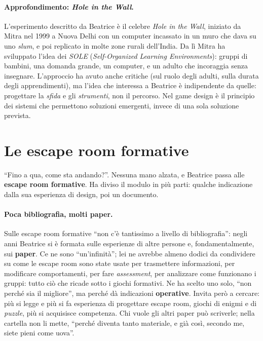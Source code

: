 \paragraph{Approfondimento: \emph{Hole in the Wall}.} L'esperimento descritto da
Beatrice è il celebre \emph{Hole in the Wall}, iniziato da Mitra nel 1999 a Nuova
Delhi con un computer incassato in un muro che dava su uno \emph{slum}, e poi
replicato in molte zone rurali dell'India. Da lì Mitra ha sviluppato l'idea dei
\emph{SOLE} (\emph{Self-Organized Learning Environments}): gruppi di bambini, una
domanda grande, un computer, e un adulto che incoraggia senza insegnare. L'approccio
ha avuto anche critiche (sul ruolo degli adulti, sulla durata degli apprendimenti),
ma l'idea che interessa a Beatrice è indipendente da quelle: progettare la
\emph{sfida} e gli \emph{strumenti}, non il percorso. Nel game design è il principio
dei sistemi che permettono soluzioni emergenti, invece di una sola soluzione
prevista.

\section{Le escape room formative}
\label{a9:sec:escape}

``Fino a qua, come sta andando?''. Nessuna mano alzata, e Beatrice passa alle
\textbf{escape room formative}. Ha diviso il modulo in più parti: qualche indicazione
dalla sua esperienza di design, poi un documento.

\paragraph{Poca bibliografia, molti paper.} Sulle escape room formative ``non c'è
tantissimo a livello di bibliografia'': negli anni Beatrice si è formata sulle
esperienze di altre persone e, fondamentalmente, sui \textbf{paper}. Ce ne sono
``un'infinità''; lei ne avrebbe almeno dodici da condividere su come le escape room
sono state usate per trasmettere informazioni, per modificare comportamenti, per fare
\emph{assessment}, per analizzare come funzionano i gruppi: tutto ciò che ricade sotto
i giochi formativi. Ne ha scelto uno solo, ``non perché sia il migliore'', ma perché
dà indicazioni \textbf{operative}. Invita però a cercare: più si legge e più si fa
esperienza di progettare escape room, giochi di enigmi e di \emph{puzzle}, più si
acquisisce competenza. Chi vuole gli altri paper può scriverle; nella cartella non li
mette, ``perché diventa tanto materiale, e già così, secondo me, siete pieni come
uova''.

